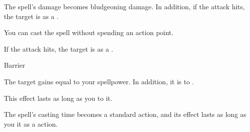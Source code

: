 
The spell's damage becomes bludgeoning damage.
In addition, if the attack hits, the target is  as a .






You can cast the spell without spending an action point.






If the attack hits, the target is  as a .





\newpage
\begin{spellsection}{Barrier}

\begin{spellheader}
\end{spellheader}

\begin{spellcontent}

\begin{spelltargetinginfo}



\end{spelltargetinginfo}


\begin{spelleffects}



\spelleffect
The target gains  equal to your spellpower.
In addition, it is  to .

This effect lasts as long as you  to it.








\end{spelleffects}

\end{spellcontent}
\begin{spellfooter}


\end{spellfooter}
\begin{spellsubcontent}


\begin{spellcantrip}
The spell's casting time becomes a standard action, and its effect lasts as long as you  it as a  action.
\end{spellcantrip}


\end{spellsubcontent}
\end{spellsection}


